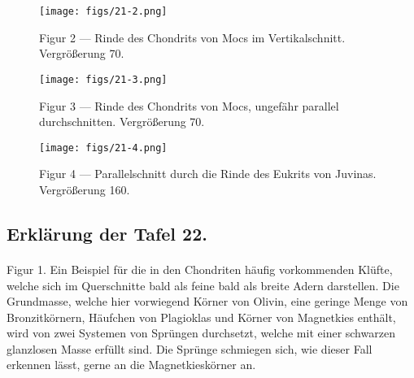 \documentclass[a4paper, 11pt, oneside, polutonikogreek, german]{article}
\begin{document}
\vspace*{\fill}
\begin{figure}[H]
\centering
\texttt{[image: figs/21-2.png]}
\caption{\small Figur 2 --- Rinde des Chondrits von Mocs im Vertikalschnitt. Vergrößerung 70.}
\end{figure}
\vspace*{\fill}
\clearpage

\vspace*{\fill}
\begin{figure}[H]
\centering
\texttt{[image: figs/21-3.png]}
\caption{\small Figur 3 --- Rinde des Chondrits von Mocs, ungefähr parallel durchschnitten. Vergrößerung 70.}
\end{figure}
\vspace*{\fill}
\clearpage

\vspace*{\fill}
\begin{figure}[H]
\centering
\texttt{[image: figs/21-4.png]}
\caption{\small Figur 4 --- Parallelschnitt durch die Rinde des Eukrits von Juvinas. Vergrößerung 160.}
\end{figure}
\vspace*{\fill}
\clearpage

\subsection{Erklärung der Tafel 22.}
\paragraph{}
Figur 1. Ein Beispiel für die in den Chondriten häufig vorkommenden Klüfte, welche sich im Querschnitte bald als feine bald als breite Adern darstellen. Die Grundmasse, welche hier vorwiegend Körner von Olivin, eine geringe Menge von Bronzitkörnern, Häufchen von Plagioklas und Körner von Magnetkies enthält, wird von zwei Systemen von Sprüngen durchsetzt, welche mit einer schwarzen glanzlosen Masse erfüllt sind. Die Sprünge schmiegen sich, wie dieser Fall erkennen lässt, gerne an die Magnetkieskörner an.
\end{document}

